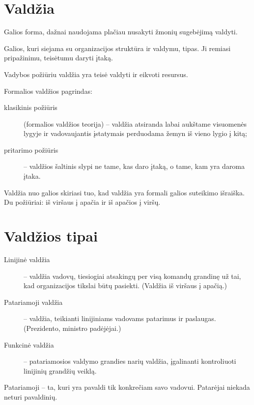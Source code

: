 \section{Valdžia}

\begin{defn}[Valdžia]
  Galios forma, dažnai naudojama plačiau nusakyti žmonių sugebėjimą
  valdyti.
\end{defn}

\begin{defn}
  Galios, kuri siejama su organizacijos struktūra ir valdymu, tipas.
  Ji remiasi pripažinimu, teisėtumu daryti įtaką.
\end{defn}

Vadybos požiūriu valdžia yra teisė valdyti ir eikvoti resursus.

Formalios valdžios pagrindas:
\begin{description}
  \item[klasikinis požiūris] (formalios valdžios teorija) – valdžia
    atsiranda labai aukštame visuomenės lygyje ir vadovaujantis
    įstatymais perduodama žemyn iš vieno lygio į kitą;
  \item[pritarimo požiūris] – valdžios šaltinis slypi ne tame, kas
    daro įtaką, o tame, kam yra daroma įtaka.
\end{description}

Valdžia nuo galios skiriasi tuo, kad valdžia yra formali galios suteikimo
išraiška. Du požiūriai: iš viršaus į apačia ir iš apačios į viršų.

\section{Valdžios tipai}

\begin{description}
  \item[Linijinė valdžia] – valdžia vadovų, tiesiogiai atsakingų per
    visą komandų grandinę už tai, kad organizacijos tikslai būtų pasiekti.
    (Valdžia iš viršaus į apačią.)
  \item[Patariamoji valdžia] – valdžia, teikianti linijiniams vadovams
    patarimus ir paslaugas. (Prezidento, ministro padėjėjai.)
  \item[Funkcinė valdžia] – patariamosios valdymo grandies narių valdžia,
    įgalinanti kontroliuoti linijinių grandžių veiklą.
\end{description}

Patariamoji – ta, kuri yra pavaldi tik konkrečiam savo vadovui. Patarėjai
niekada neturi pavaldinių.

